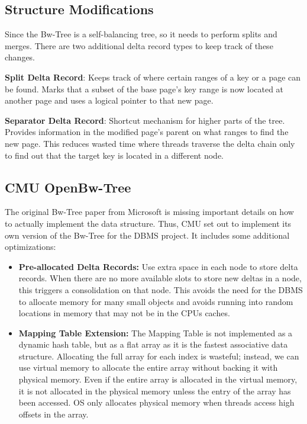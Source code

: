 \documentclass[11pt]{article}
\begin{document}
\subsection*{Structure Modifications}
Since the Bw-Tree is a self-balancing tree, so it needs to perform splits and merges. There are 
two additional delta record types to keep track of these changes.

\textbf{Split Delta Record}:
Keeps track of where certain ranges of a key or a page can be 
found. Marks that a subset of the base page's key range is now located at another page and uses a 
logical pointer to that new page.

\textbf{Separator Delta Record}:
Shortcut mechanism for higher parts of the tree. Provides information in the modified page's parent 
on what ranges to find the new page. This reduces wasted time where threads traverse the delta 
chain only to find out that the target key is located in a different node.

\subsection*{CMU OpenBw-Tree}
The original Bw-Tree paper from Microsoft is missing important details on how to actually 
implement the data structure. Thus, CMU set out to implement its own version of 
the Bw-Tree\cite{wang18} for the  DBMS project. It includes some additional 
optimizations:

\begin{itemize}
    \item \textbf{Pre-allocated Delta Records:}
    Use extra space in each node to store delta records. When 
    there are no more available slots to store new deltas in a node, this triggers a consolidation 
    on that node. This avoids the need for the DBMS to allocate memory for many small objects and 
    avoids running into random locations in memory that may not be in the CPUs caches.
    
    \item \textbf{Mapping Table Extension:}
    The Mapping Table is not implemented as a dynamic hash table, 
    but as a flat array as it is the fastest associative data structure. Allocating the full array 
    for each index is wasteful; instead, we can use virtual memory to allocate the entire array 
    without backing it with physical memory. Even if the entire array is allocated in the virtual 
    memory, it is not allocated in the physical memory unless the entry of the array has been 
    accessed. OS only allocates physical memory when threads access high offsets in the array.
\end{itemize}

\newpage


\end{document}
